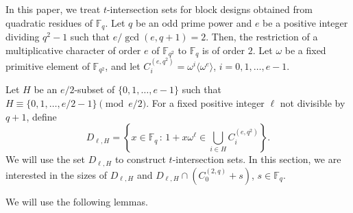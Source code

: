 \documentclass[10pt]{amsart}
\theoremstyle{definition}
\newcommand*\F{{\mathbb F}}
\begin{document}
In this paper, we treat $t$-intersection sets for block designs obtained from quadratic residues of $\F_q$. Let $q$ be an odd prime power and $e$ be a positive integer dividing $q^2-1$ such that $e/\gcd{(e,q+1)}=2$. Then, the restriction of a multiplicative character of order $e$ of $\F_{q^2}$ to $\F_q$ is of order $2$. Let $\omega$ be a fixed primitive element of $\F_{q^2}$, and let $C_i^{(e,q^2)}=\omega^i\langle \omega^e\rangle$, $i=0,1,\ldots,e-1$.

Let $H$ be an $e/2$-subset of $\{0,1,\ldots,e-1\}$ such that $H\equiv \{0,1,\ldots,e/2-1\}\pmod{e/2}$. For a fixed positive integer $\ell$ not divisible by $q+1$, define
\begin{equation}\label{eq:defDDD}
D_{\ell,H}=\left\{x\in \F_q\,:\,1+x \omega^\ell\in \bigcup_{i \in H}C_i^{(e,q^2)}\right\}.
\end{equation}
We will use the set $D_{\ell,H}$ to construct $t$-intersection sets. In this section, we are interested in the sizes of $D_{\ell,H}$ and $D_{\ell,H}\cap (C_0^{(2,q)}+s)$, $s\in \F_q$.

We will use the following lemmas.
\end{document}
